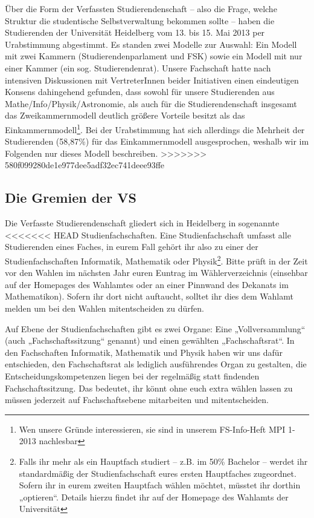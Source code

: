 Über die Form der Verfassten Studierendenschaft -- also die Frage, welche
Struktur die studentische Selbstverwaltung bekommen sollte -- haben die Studierenden
der Universität Heidelberg vom 13. bis 15. Mai 2013 per Urabstimmung abgestimmt.
Es standen zwei Modelle zur Auswahl: Ein Modell mit zwei
Kammern (Studierendenparlament und FSK) sowie ein Modell mit nur einer
Kammer (ein sog. Studierendenrat). Unsere Fachschaft hatte nach intensiven Diskussionen mit
VertreterInnen beider Initiativen einen eindeutigen
Konsens dahingehend gefunden, dass sowohl für unsere Studierenden aus
Mathe/Info/Physik/Astronomie, als auch für die Studierendenschaft
insgesamt das Zweikammernmodell deutlich größere Vorteile besitzt als
das Einkammernmodell\footnote{Wen unsere Gründe interessieren, sie sind in unserem FS-Info-Heft MPI 1-2013 nachlesbar}.
Bei der Urabstimmung hat sich allerdings die Mehrheit der Studierenden (58,87\%)
für das Einkammernmodell ausgesprochen, weshalb wir im Folgenden nur dieses Modell beschreiben.
>>>>>>> 580f099280de1e977dee5adf32ec741deee93ffe



\subsection{Die Gremien der VS}

Die Verfasste Studierendenschaft gliedert sich in Heidelberg in sogenannte
<<<<<<< HEAD
Studienfachschaften. Eine Studienfachschaft umfasst alle Studierenden eines
Faches, in eurem Fall gehört ihr also zu einer der Studienfachschaften
Informatik, Mathematik oder Physik\footnote{Falls ihr mehr als ein Hauptfach
studiert -- z.B. im 50\% Bachelor -- werdet ihr standardmäßig der
Studienfachschaft eures ersten Hauptfaches zugeordnet.  Sofern ihr in eurem
zweiten Hauptfach wählen möchtet, müsstet ihr dorthin „optieren“.  Details
hierzu findet ihr auf der Homepage des Wahlamts der Universität}.  Bitte prüft
in der Zeit vor den Wahlen im nächsten Jahr euren Euntrag im Wählerverzeichnis
(einsehbar auf der Homepages des Wahlamtes oder an einer Pinnwand des Dekanats
im Mathematikon). Sofern ihr dort nicht auftaucht, solltet ihr dies dem Wahlamt
melden um bei den Wahlen mitentscheiden zu dürfen.

Auf Ebene der Studienfachschaften gibt es zwei Organe: Eine „Vollversammlung“
(auch „Fachschaftssitzung“ genannt) und einen gewählten „Fachschaftsrat“. In
den Fachschaften Informatik, Mathematik und Physik haben wir uns dafür
entschieden, den Fachschaftsrat als lediglich ausführendes Organ zu gestalten,
die Entscheidungskompetenzen liegen bei der regelmäßig statt findenden
Fachschaftssitzung.  Das bedeutet, ihr könnt ohne euch extra wählen lassen zu
müssen jederzeit auf Fachschaftsebene mitarbeiten und mitentscheiden.

